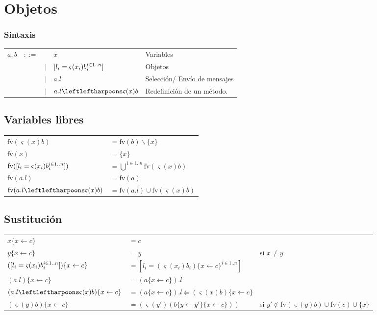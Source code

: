 \documentclass[10pt,a4paper]{article}
\begin{document}
\newpage
\section{Objetos}
\subsubsection{Sintaxis}
\begin{tabular}{lllll}
	$a,b$ &$::=$& &$x$ & Variables \\
 	      &     & $|$ &$[l_i = \varsigma(x_i)b_i^{i\in1..n}]$ &  Objetos\\
 	      &     & $|$ &$a.l$ &  Selección/ Envío de mensajes \\
 	      &     & $|$ &$\OORedefinicion{a.l}{x}{b}$ &  Redefinición de un método.	       	       	      
\end{tabular}

\subsection{Variables libres}
\begin{tabular}{ll}
	$\text{fv}(\varsigma(x)b)$ &$= \text{fv}(b)\backslash \{x\} $\\
	$\text{fv}(x)$ &$= \{x\} $\\
	$\text{fv}([l_i = \varsigma(x_i)b_i^{i\in 1..n}])$ &$=  \bigcup^{1\in 1..n} \text{fv}(\varsigma(x)b)$\\
	$\text{fv}(a.l)$ &$= \text{fv}(a) $\\
	$\text{fv}(\OORedefinicion{a.l}{x}{b})$ &$= \text{fv}(a.l)\cup \text{fv}(\varsigma(x)b) $\\
\end{tabular}

\subsection{Sustitución}
\begin{center}
\begin{tabular}{lll}
	$x\{x \leftarrow c\}$ &$= c$ & \\
	$y\{x \leftarrow c\}$ &$= y$ & si $x\neq y$\\
	$([l_i = \varsigma(x_i)b_i^{i\in 1..n}])\{x \leftarrow c\}$ &$=  [l_i = (\varsigma(x_i)b_i)\{x \leftarrow c\}^{i\in 1..n}]$ & \\
	$(a.l)\{x \leftarrow c\}$ &$= (a\{x \leftarrow c\}).l $ & \\
	$(\OORedefinicion{a.l}{x}{b})\{x \leftarrow c\}$ &$= (a\{x \leftarrow c\}).l \leftleftharpoons (\varsigma(x)b)\{x \leftarrow c\} $ & \\
	$(\varsigma(y)b)\{x \leftarrow c\}$ &$= (\varsigma(y')(b\{y \leftarrow y'\}\{x \leftarrow c\})) $ & si $y'\notin$fv$(\varsigma(y)b)\cup$fv$(c)\cup\{x\}$ \\
\end{tabular}
\end{center}
\end{document}
